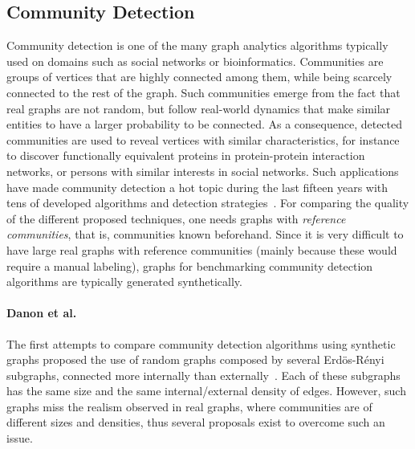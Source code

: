 \subsection{Community Detection}
\label{sec:generators_community_detection}

Community detection is one of the many graph analytics algorithms typically used
on domains such as social networks or bioinformatics. Communities are groups of
vertices that are highly connected among them, while being scarcely connected to
the rest of the graph. Such communities emerge from the fact that real graphs
are not random, but follow real-world dynamics that make similar entities to
have a larger probability to be connected. As a consequence, detected
communities are used to reveal vertices with similar characteristics, for
instance to discover functionally equivalent proteins in protein-protein
interaction networks, or persons with similar interests in social networks. Such
applications have made community detection a hot topic during the last fifteen
years with tens of developed algorithms and detection
strategies~\cite{doi:10.1002/wics.1403,Kim:2015:CDM:2854006.2854013}. For
comparing the quality of the different proposed techniques, one needs graphs
with \emph{reference communities}, that is, communities known beforehand. Since
it is very difficult to have large real graphs with reference communities
(mainly because these would require a manual labeling), graphs for benchmarking
community detection algorithms are typically generated synthetically.

\paragraph{Danon et al.} The first attempts to compare community detection algorithms using synthetic
graphs proposed the use of random graphs composed by several Erd\"{o}s-R\'{e}nyi
subgraphs, connected more internally than externally~\cite{danon2005comparing}.
Each of these subgraphs has the same size and the same internal/external density
of edges. However, such graphs miss the realism observed in real graphs, where
communities are of different sizes and densities, thus several proposals exist
to overcome such an issue.

